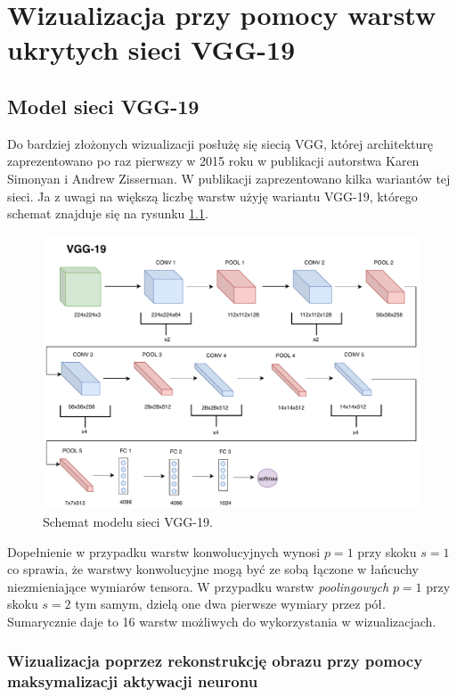\chapter{Wizualizacja przy pomocy warstw ukrytych sieci VGG-19}
\label{chap:vgg}
\section{Model sieci VGG-19}
\label{vgg-model}

Do bardziej złożonych wizualizacji posłużę się siecią VGG, której architekturę zaprezentowano po raz pierwszy w 2015 roku w publikacji autorstwa Karen Simonyan i 
Andrew Zisserman\cite{vggpaper}. W publikacji zaprezentowano kilka wariantów tej sieci. Ja z uwagi na większą liczbę warstw użyję wariantu VGG-19, którego schemat znajduje się na rysunku \ref{fig:vgg19-schemat}.

\begin{figure}[ht]
\centerline{\includegraphics[scale=0.5]{resources/vgg/vgg.pdf}}
\caption{Schemat modelu sieci VGG-19.}
\label{fig:vgg19-schemat}
\end{figure}

Dopełnienie w przypadku warstw konwolucyjnych wynosi \(p=1\) przy skoku \(s=1\) co sprawia, że warstwy konwolucyjne mogą być ze sobą łączone w łańcuchy niezmieniające wymiarów tensora. W przypadku warstw \textit{poolingowych} \(p=1\) przy skoku \(s=2\) tym samym, dzielą one dwa pierwsze wymiary przez pół. Sumarycznie daje to 16 warstw możliwych do wykorzystania w wizualizacjach.

\subsection{Wizualizacja poprzez rekonstrukcję obrazu przy pomocy maksymalizacji aktywacji neuronu}
\label{vgg-mean-activation}

